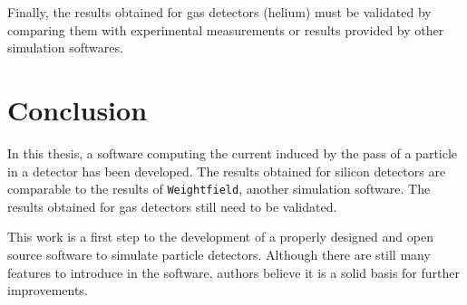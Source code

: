 \documentclass[11pt]{article}
\begin{document}
Finally, the results obtained for gas detectors (helium) must be validated
by comparing them with experimental measurements or results provided by other
simulation softwares.

\section*{Conclusion}

In this thesis, a software computing the current induced by the pass of a
particle in a detector has been developed. The results obtained for silicon
detectors are comparable to the results of \texttt{Weightfield},
another simulation software. The results obtained for gas detectors still
need to be validated.

This work is a first step to the development of a properly designed and open source
software to simulate particle detectors. Although there are still
many features to introduce in the software, authors believe it is a solid
basis for further improvements.

\newpage



\end{document}
